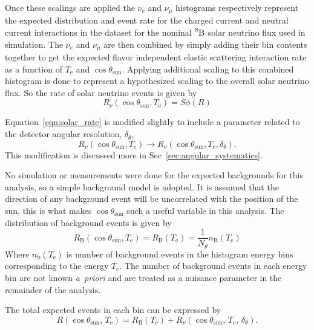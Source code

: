 Once these scalings are applied the $\nu_{e}$ and $\nu_{\mu}$ histograms
respectively  represent the expected distribution and event rate for the charged current
and neutral current interactions in the dataset for the nominal $\ce{^{8}B}$
solar neutrino flux used in simulation.
The $\nu_{e}$ and $\nu_{\mu}$ are then combined by
simply adding their bin contents together to get the expected
flavor independent elastic scattering interaction rate as a function
of $T_{\mathrm{e}}$ and $\cos\theta_{\mathrm{sun}}$.
Applying additional scaling to this combined histogram is done to represent
a hypothesized scaling to the overall solar neutrino flux.
So the rate of solar neutrino events is given by
\begin{equation}
    R_{\nu}(\cos\theta_{\mathrm{sun}}, T_{\mathrm{e}}) =
    S\phi\left(R \right)
    \label{eqn:solar_rate}
\end{equation}

Equation~\eqref{eqn:solar_rate} is modified slightly to include a parameter
related to the detector angular resolution, $\delta_{\theta}$,
\begin{equation}
R_{\nu}(\cos\theta_{\mathrm{sun}}, T_{\mathrm{e}}) \rightarrow
    R_{\nu}(\cos\theta_{\mathrm{sun}}, T_{\mathrm{e}}, \delta_{\theta})\text{.}
\end{equation}
This modification is discussed more in Sec~\ref{sec:angular_systematics}.

No simulation or measurements were done for the expected backgrounds for this analysis,
so a simple background model is adopted.
It is assumed that the direction of any background event will be uncorrelated
with the position of the sun, this is what makes $\cos\theta_{\mathrm{sun}}$ such a
useful variable in this analysis.
The distribution of background events is given by
\begin{equation}
    R_{\mathrm{B}}(\cos\theta_{\mathrm{sun}}, T_{\mathrm{e}}) =
    R_{\mathrm{B}}(T_{\mathrm{e}}) = \frac{1}{N_\theta}n_{\mathrm{B}}(T_{\mathrm{e}})
\end{equation}
Where $n_{\mathrm{b}}(T_{\mathrm{e}})$ is number of background events in the
histogram energy bins corresponding to the energy $T_{\mathrm{e}}$.
The number of background events in each energy bin are not known \textit{a~priori}
and are treated as a nuisance parameter in the remainder of the analysis.

The total expected events in each bin can be expressed by
\begin{equation}
    R(\cos\theta_{\mathrm{sun}}\text{, }T_{\mathrm{e}}) =
    R_{\mathrm{B}}(T_{\mathrm{e}}) + R_{\nu}(\cos\theta_{\mathrm{sun}}\text{, }T_{\mathrm{e}}\text{, }\delta_{\theta})\text{.}
    \label{eqn:event_rate}
\end{equation}

